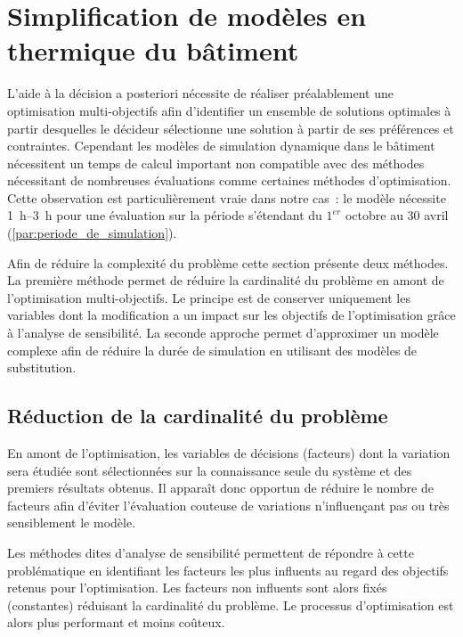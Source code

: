 \section{Simplification de modèles en thermique du bâtiment} %
\label{sec:simplification_de_modeles_en_thermique_du_batiment}
L’aide à la décision a posteriori nécessite de réaliser préalablement une optimisation
multi-objectifs afin d’identifier un ensemble de solutions optimales à partir desquelles le
décideur sélectionne une solution à partir de ses préférences et contraintes.
Cependant les modèles de simulation dynamique dans le bâtiment nécessitent un temps de calcul
important non compatible avec des méthodes nécessitant de nombreuses évaluations comme
certaines méthodes d’optimisation. Cette observation est particulièrement vraie dans notre
cas~: le modèle nécessite \SIrange{1}{3}{\hour} pour une évaluation sur la période s’étendant
du $1^{er}$ octobre au $30$ avril (\ref{par:periode_de_simulation}).

Afin de réduire la complexité du problème cette section présente deux méthodes.
La première méthode permet de réduire la cardinalité du problème en amont de
l’optimisation multi-objectifs. Le principe est de conserver uniquement les variables
dont la modification a un impact sur les objectifs de l’optimisation grâce à l’analyse de
sensibilité. La seconde approche permet d’approximer un modèle complexe afin de réduire la
durée de simulation en utilisant des modèles de substitution.


\subsection{Réduction de la cardinalité du problème} %
\label{sub:reduction_de_la_cardinalite_du_probleme}
En amont de l’optimisation, les variables de décisions (facteurs) dont la variation sera
étudiée sont sélectionnées sur la connaissance seule du système et des premiers résultats
obtenus. Il apparaît donc opportun de réduire le nombre de facteurs afin d’éviter
l’évaluation couteuse de variations n’influençant pas ou très sensiblement le modèle.

Les méthodes dites d’analyse de sensibilité permettent de répondre à cette problématique
en identifiant les facteurs les plus influents au regard des objectifs retenus pour
l’optimisation. Les facteurs non influents sont alors fixés (constantes) réduisant la
cardinalité du problème. Le processus d’optimisation est alors plus performant et moins
coûteux.

